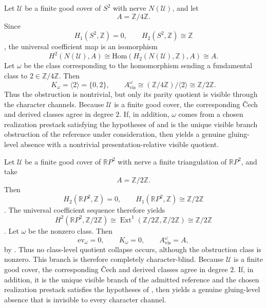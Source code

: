 \begin{example}\label{ex:s2-visible-quotient}
Let $\mathcal U$ be a finite good cover of $S^2$ with nerve $N(\mathcal U)$, and let
\[
A=\mathbb Z/4\mathbb Z.
\]
Since
\[
H_1(S^2,\mathbb Z)=0,
\qquad
H_2(S^2,\mathbb Z)\cong \mathbb Z
\]
\cite[Secs.~2.1, 2.2]{Hatcher2002}, the universal coefficient map is an isomorphism
\[
H^2(N(\mathcal U),A)\cong \mathrm{Hom}(H_2(N(\mathcal U),\mathbb Z),A)\cong A.
\]
Let $\omega$ be the class corresponding to the homomorphism sending a fundamental class to $2\in\mathbb Z/4\mathbb Z$. Then
\[
K_{\omega}=\langle 2\rangle=\{0,2\},
\qquad
A_{\mathrm{vis}}^{\omega}\cong (\mathbb Z/4\mathbb Z)/\langle 2\rangle\cong \mathbb Z/2\mathbb Z.
\]
Thus the obstruction is nontrivial, but only its parity quotient is visible through the character channels. Because $\mathcal U$ is a finite good cover, the corresponding \v{C}ech and derived classes agree in degree $2$. If, in addition, $\omega$ comes from a chosen realization prestack satisfying the hypotheses of  and is the unique visible branch obstruction of the reference under consideration, then  yields a genuine gluing-level absence with a nontrivial presentation-relative visible quotient.
\end{example}

\begin{example}\label{ex:rp2-character-blind}
Let $\mathcal U$ be a finite good cover of $\mathbb{R}P^2$ with nerve a finite triangulation of $\mathbb{R}P^2$, and take
\[
A=\mathbb Z/2\mathbb Z.
\]
Then
\[
H_2(\mathbb{R}P^2,\mathbb Z)=0,
\qquad
H_1(\mathbb{R}P^2,\mathbb Z)\cong \mathbb Z/2\mathbb Z
\]
\cite[Sec.~2.2]{Hatcher2002}. The universal coefficient sequence therefore yields
\[
H^2(\mathbb{R}P^2,\mathbb Z/2\mathbb Z)
\cong
\operatorname{Ext}^1(\mathbb Z/2\mathbb Z,\mathbb Z/2\mathbb Z)
\cong
\mathbb Z/2\mathbb Z
\]
\cite[Sec.~3.1]{Hatcher2002}. Let $\omega$ be the nonzero class. Then
\[
\mathrm{ev}_{\omega}=0,
\qquad
K_{\omega}=0,
\qquad
A_{\mathrm{vis}}^{\omega}=A,
\]
by . Thus no class-level quotient collapse occurs, although the obstruction class is nonzero. This branch is therefore completely character-blind. Because $\mathcal U$ is a finite good cover, the corresponding \v{C}ech and derived classes agree in degree $2$. If, in addition, it is the unique visible branch of the admitted reference and the chosen realization prestack satisfies the hypotheses of , then  yields a genuine gluing-level absence that is invisible to every character channel.
\end{example}

